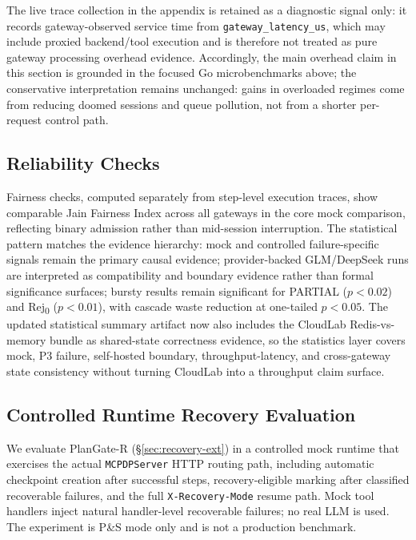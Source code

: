 \documentclass[sigconf,review,anonymous]{acmart}
\begin{document}
The live trace collection in the appendix is retained as a diagnostic signal only: it records gateway-observed service time from \texttt{gateway\_latency\_us}, which may include proxied backend/tool execution and is therefore not treated as pure gateway processing overhead evidence. Accordingly, the main overhead claim in this section is grounded in the focused Go microbenchmarks above; the conservative interpretation remains unchanged: gains in overloaded regimes come from reducing doomed sessions and queue pollution, not from a shorter per-request control path.

\subsection{Reliability Checks}
\label{sec:fairness}
\label{sec:stats}

Fairness checks, computed separately from step-level execution traces, show comparable Jain Fairness Index across all gateways in the core mock comparison, reflecting binary admission rather than mid-session interruption. The statistical pattern matches the evidence hierarchy: mock and controlled failure-specific signals remain the primary causal evidence; provider-backed GLM/DeepSeek runs are interpreted as compatibility and boundary evidence rather than formal significance surfaces; bursty results remain significant for PARTIAL ($p{<}0.02$) and Rej\textsubscript{0} ($p{<}0.01$), with cascade waste reduction at one-tailed $p{<}0.05$. The updated statistical summary artifact now also includes the CloudLab Redis-vs-memory bundle as shared-state correctness evidence, so the statistics layer covers mock, P3 failure, self-hosted boundary, throughput-latency, and cross-gateway state consistency without turning CloudLab into a throughput claim surface.

\subsection{Controlled Runtime Recovery Evaluation}
\label{sec:recovery-eval}

We evaluate PlanGate-R (\S\ref{sec:recovery-ext}) in a controlled mock runtime that exercises the actual \texttt{MCPDPServer} HTTP routing path, including automatic checkpoint creation after successful steps, recovery-eligible marking after classified recoverable failures, and the full \texttt{X-Recovery-Mode} resume path.
Mock tool handlers inject natural handler-level recoverable failures; no real LLM is used.
The experiment is P\&S mode only and is not a production benchmark.
\end{document}

